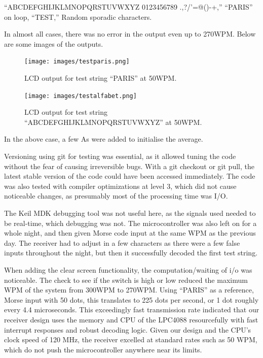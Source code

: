 \documentclass[head=13.6pt]{cce2014-design}
\begin{document}
“ABCDEFGHIJKLMNOPQRSTUVWXYZ 0123456789 .,?/'=@()-+,”
“PARIS” on loop,
“TEST,”
Random sporadic characters.

In almost all cases, there was no error in the output even up to 270WPM. Below are some images of the outputs.

\begin{figure}[tb]
    \centering
    \texttt{[image: images/testparis.png]}
    \caption{LCD output for test string ``PARIS'' at 50WPM.}
    \label{testparis}
\end{figure}

\begin{figure}[tb]
    \centering
    \texttt{[image: images/testalfabet.png]}
    \caption{LCD output for test string ``ABCDEFGHIJKLMNOPQRSTUVWXYZ'' at 50WPM.}
    \label{testalfabet}
\end{figure}

In the above case, a few As were added to initialise the average.



Versioning using git for testing was essential, as it allowed tuning the code without the fear of causing irreversible bugs. With a git checkout or git pull, the latest stable version of the code could have been accessed immediately. The code was also tested with compiler optimizations at level 3, which did not cause noticeable changes, as presumably most of the processing time was I/O.

The Keil MDK debugging tool was not useful here, as the signals used needed to be real-time, which debugging was not. The microcontroller was also left on for a whole night, and then given Morse code input at the same WPM as the previous day. The receiver had to adjust in a few characters as there were a few false inputs throughout the night, but then it successfully decoded the first test string.

When adding the clear screen functionality, the computation/waiting of i/o was noticeable. The check to see if the switch is high or low reduced the maximum WPM of the system from 300WPM to 270WPM. Using “PARIS” as a reference, Morse input with 50 dots, this translates to 225 dots per second, or 1 dot roughly every 4.4 microseconds. This exceedingly fast transmission rate indicated that our receiver design uses the memory and CPU of the LPC4088 resourcefully with fast interrupt responses and robust decoding logic. Given our design and the CPU’s clock speed of 120 MHz, the receiver excelled at standard rates such as 50 WPM, which do not push the microcontroller anywhere near its limits.
\end{document}
